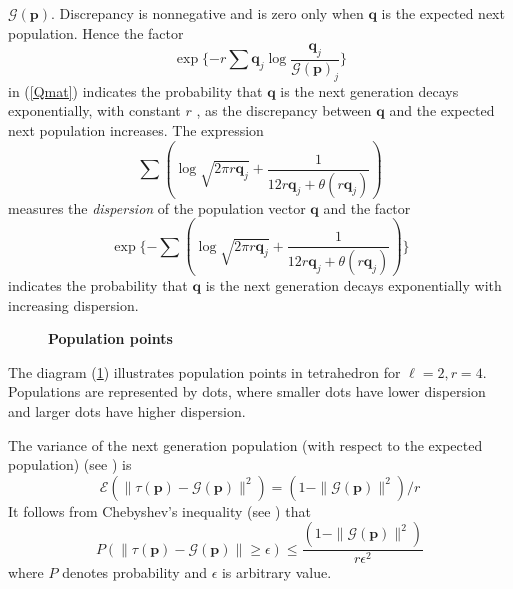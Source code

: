 $\mathcal{G}(\bm{p})$. Discrepancy is nonnegative and is zero only when $\bm{q}$ is the expected next population. Hence the factor 
\[
\exp\{-r \sum \bm{q}_j \log \frac{\bm{q}_j}{\mathcal{G}(\bm{p})_j}\}
\]
in (\ref{Qmat}) indicates the probability that $\bm{q}$ is the next generation
decays exponentially, with constant $r$ , as the discrepancy between $\bm{q}$ and the
expected next population increases.
The expression 
\[
\sum (\log \sqrt{2 \pi r\bm{q}_j} + \frac{1}{12r\bm{q}_j + \theta (r\bm{q}_j)})
\]
measures the {\em dispersion} of the population vector $\bm{q}$ and the factor
\[
\exp\{- \sum (\log \sqrt{2 \pi r\bm{q}_j} + \frac{1}{12r\bm{q}_j + \theta (r\bm{q}_j)})\}
\]
indicates the probability that $\bm{q}$ is the next generation decays exponentially with increasing dispersion.

\begin{figure}[H]
\begin{center}
\hspace{4pt}
\caption{\textbf{Population points} }
\label{tetra_popn}
\end{center}
\end{figure}

The diagram (\ref{tetra_popn}) illustrates population points in tetrahedron for $\ell  =  2,  r  =  4$. Populations are represented by dots, 
where smaller dots have lower dispersion and larger dots have higher dispersion.

The variance of the next generation population (with respect to the expected population) (see \cite{Vose1999}) is 
\begin{equation}
\label{RHSvariance}
\mathcal{E}(\| \tau (\bm{p}) - \mathcal{G}(\bm{p}) \|^2) = (1 - \|\mathcal{G}(\bm{p})\|^2) / r
\end{equation}
It follows from Chebyshev's inequality (see \cite{ChebyshevInequality}) that 
\begin{equation}
\label{Cheby}
P(\| \tau (\bm{p}) - \mathcal{G}(\bm{p}) \| \geq \epsilon) \leq \frac{(1 - \|\mathcal{G}(\bm{p})\|^2)} {r{\epsilon}^2}
\end{equation}
where $P$ denotes probability and $\epsilon$ is arbitrary value.

